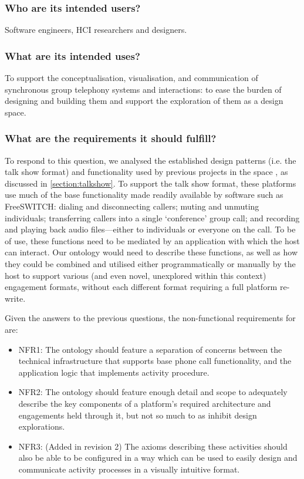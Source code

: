 \subsubsection{Who are its intended users?}
Software engineers, HCI researchers and designers.

\subsubsection{What are its intended uses?} To support the conceptualisation, visualisation, and communication of synchronous group telephony systems and interactions: to ease the burden of designing and building them and support the exploration of them as a design space.


\subsubsection{What are the requirements it should fulfill?}
 
To respond to this question, we analysed the established design patterns (i.e. the talk show format) and functionality used by previous projects in the space \cite{Kazakos2016, Talhouk2017, Yadav2017}, as discussed in \ref{section:talkshow}. To support the talk show format, these platforms use much of the base functionality made readily available by software such as FreeSWITCH: dialing and disconnecting callers; muting and unmuting individuals; transferring callers into a single `conference' group call; and recording and playing back audio files---either to individuals or everyone on the call. To be of use, these functions need to be mediated by an application with which the host can interact. Our ontology would need to describe these functions, as well as how they could be combined and utilised either programmatically or manually by the host to support various (and even novel, unexplored within this context) engagement formats, without each different format requiring a full platform re-write.

Given the answers to the previous questions, the non-functional requirements for \ONT{} are:

\begin{itemize}
    \item NFR1: The ontology should feature a separation of concerns between the technical infrastructure that supports base phone call functionality, and the application logic that implements activity procedure.
    \item NFR2: The ontology should feature enough detail and scope to adequately describe the key components of a platform's required architecture and engagements held through it, but not so much to as inhibit design explorations.
    \item NFR3: (Added in revision 2) The axioms describing these activities should also be able to be configured in a way which can be used to easily design and communicate activity processes in a visually intuitive format.
\end{itemize}

